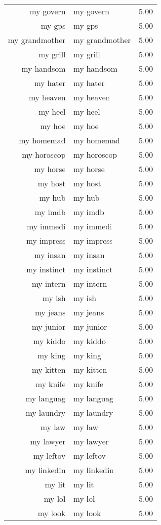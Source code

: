 \begin{table}[ht]
\begin{tabular}{rlr}
  my govern & my govern & 5.00 \\ 
  my gps & my gps & 5.00 \\ 
  my grandmother & my grandmother & 5.00 \\ 
  my grill & my grill & 5.00 \\ 
  my handsom & my handsom & 5.00 \\ 
  my hater & my hater & 5.00 \\ 
  my heaven & my heaven & 5.00 \\ 
  my heel & my heel & 5.00 \\ 
  my hoe & my hoe & 5.00 \\ 
  my homemad & my homemad & 5.00 \\ 
  my horoscop & my horoscop & 5.00 \\ 
  my horse & my horse & 5.00 \\ 
  my host & my host & 5.00 \\ 
  my hub & my hub & 5.00 \\ 
  my imdb & my imdb & 5.00 \\ 
  my immedi & my immedi & 5.00 \\ 
  my impress & my impress & 5.00 \\ 
  my insan & my insan & 5.00 \\ 
  my instinct & my instinct & 5.00 \\ 
  my intern & my intern & 5.00 \\ 
  my ish & my ish & 5.00 \\ 
  my jeans & my jeans & 5.00 \\ 
  my junior & my junior & 5.00 \\ 
  my kiddo & my kiddo & 5.00 \\ 
  my king & my king & 5.00 \\ 
  my kitten & my kitten & 5.00 \\ 
  my knife & my knife & 5.00 \\ 
  my languag & my languag & 5.00 \\ 
  my laundry & my laundry & 5.00 \\ 
  my law & my law & 5.00 \\ 
  my lawyer & my lawyer & 5.00 \\ 
  my leftov & my leftov & 5.00 \\ 
  my linkedin & my linkedin & 5.00 \\ 
  my lit & my lit & 5.00 \\ 
  my lol & my lol & 5.00 \\ 
  my look & my look & 5.00 \\ 

\end{tabular}
\end{table}
